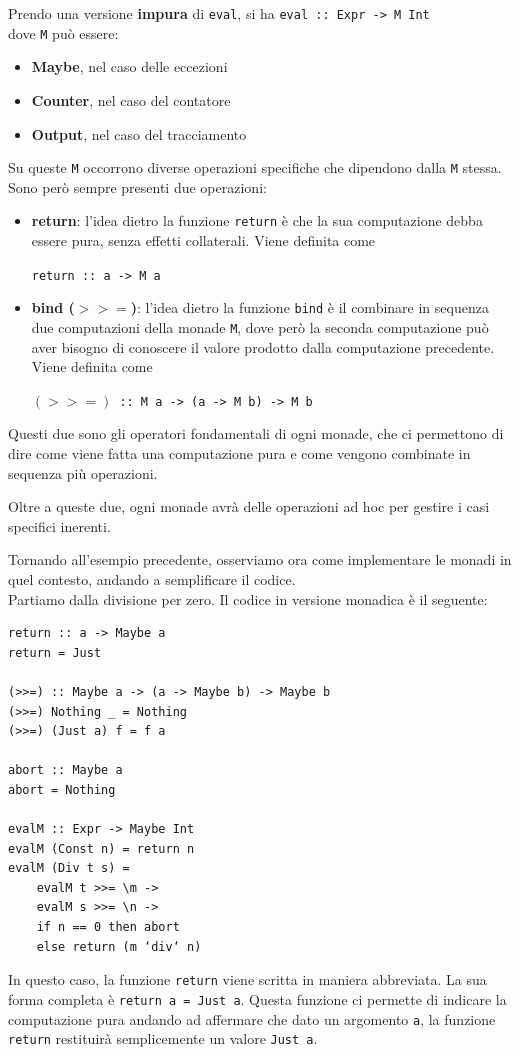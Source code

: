 \documentclass{article}
\begin{document}
Prendo una versione \textbf{impura} di \texttt{eval}, si ha \texttt{\quad eval :: Expr -> M Int}\\
dove \texttt{M} può essere:
\begin{itemize}
    \item \textbf{Maybe}, nel caso delle eccezioni
    \item \textbf{Counter}, nel caso del contatore
    \item \textbf{Output}, nel caso del tracciamento
\end{itemize}
Su queste \texttt{M} occorrono diverse operazioni specifiche che dipendono dalla \texttt{M} stessa. Sono però sempre presenti due operazioni:
\begin{itemize}
    \item \textbf{return}: l'idea dietro la funzione \texttt{return} è che la sua computazione debba essere pura, senza effetti collaterali. Viene definita come 
    \begin{center}
        \texttt{return :: a -> M a}
    \end{center}
    \item \textbf{bind ($>>=$)}: l'idea dietro la funzione \texttt{bind} è il combinare in sequenza due computazioni della monade \texttt{M}, dove però la seconda computazione può aver bisogno di conoscere il valore prodotto dalla computazione precedente. Viene definita come
    \begin{center}
        \texttt{$(>>=)$ :: M a -> (a -> M b) -> M b }    
    \end{center}
\end{itemize}
Questi due sono gli operatori fondamentali di ogni monade, che ci permettono di dire come viene fatta una computazione pura e come vengono combinate in sequenza più operazioni.

Oltre a queste due, ogni monade avrà delle operazioni ad hoc per gestire i casi specifici inerenti.

Tornando all'esempio precedente, osserviamo ora come implementare le monadi in quel contesto, andando a semplificare il codice.\vspace{14pt}\\
Partiamo dalla divisione per zero. Il codice in versione monadica è il seguente:
\begin{tcolorbox}
\begin{verbatim}
return :: a -> Maybe a
return = Just

(>>=) :: Maybe a -> (a -> Maybe b) -> Maybe b
(>>=) Nothing _ = Nothing
(>>=) (Just a) f = f a

abort :: Maybe a
abort = Nothing

evalM :: Expr -> Maybe Int
evalM (Const n) = return n
evalM (Div t s) =
    evalM t >>= \m ->
    evalM s >>= \n ->
    if n == 0 then abort
    else return (m ‘div‘ n)
\end{verbatim}
\end{tcolorbox}
In questo caso, la funzione \texttt{return} viene scritta in maniera abbreviata. La sua forma completa è \texttt{return a = Just a}. Questa funzione ci permette di indicare la computazione pura andando ad affermare che dato un argomento \texttt{a}, la funzione \texttt{return} restituirà semplicemente un valore \texttt{Just a}.
\end{document}
